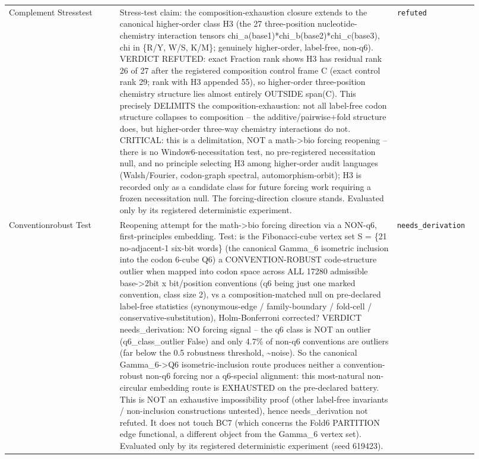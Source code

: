 \begin{longtable}{>{\raggedright\arraybackslash}p{0.22\linewidth}>{\raggedright\arraybackslash}p{0.55\linewidth}>{\raggedright\arraybackslash}p{0.15\linewidth}}
Complement Stresstest & Stress-test claim: the composition-exhaustion closure extends to the canonical higher-order class H3 (the 27 three-position nucleotide-chemistry interaction tensors chi\_a(base1)*chi\_b(base2)*chi\_c(base3), chi in \{R/Y, W/S, K/M\}; genuinely higher-order, label-free, non-q6). VERDICT REFUTED: exact Fraction rank shows H3 has residual rank 26 of 27 after the registered composition control frame C (exact control rank 29; rank with H3 appended 55), so higher-order three-position chemistry structure lies almost entirely OUTSIDE span(C). This precisely DELIMITS the composition-exhaustion: not all label-free codon structure collapses to composition -- the additive/pairwise+fold structure does, but higher-order three-way chemistry interactions do not. CRITICAL: this is a delimitation, NOT a math->bio forcing reopening -- there is no Window6-necessitation test, no pre-registered necessitation null, and no principle selecting H3 among higher-order audit languages (Walsh/Fourier, codon-graph spectral, automorphism-orbit); H3 is recorded only as a candidate class for future forcing work requiring a frozen necessitation null. The forcing-direction closure stands. Evaluated only by its registered deterministic experiment. & \texttt{refuted} \\
Conventionrobust Test & Reopening attempt for the math->bio forcing direction via a NON-q6, first-principles embedding. Test: is the Fibonacci-cube vertex set S = \{21 no-adjacent-1 six-bit words\} (the canonical Gamma\_6 isometric inclusion into the codon 6-cube Q6) a CONVENTION-ROBUST code-structure outlier when mapped into codon space across ALL 17280 admissible base->2bit x bit/position conventions (q6 being just one marked convention, class size 2), vs a composition-matched null on pre-declared label-free statistics (synonymous-edge / family-boundary / fold-cell / conservative-substitution), Holm-Bonferroni corrected? VERDICT needs\_derivation: NO forcing signal -- the q6 class is NOT an outlier (q6\_class\_outlier False) and only 4.7\% of non-q6 conventions are outliers (far below the 0.5 robustness threshold, \textasciitilde{}noise). So the canonical Gamma\_6->Q6 isometric-inclusion route produces neither a convention-robust non-q6 forcing nor a q6-special alignment: this most-natural non-circular embedding route is EXHAUSTED on the pre-declared battery. This is NOT an exhaustive impossibility proof (other label-free invariants / non-inclusion constructions untested), hence needs\_derivation not refuted. It does not touch BC7 (which concerns the Fold6 PARTITION edge functional, a different object from the Gamma\_6 vertex set). Evaluated only by its registered deterministic experiment (seed 619423). & \texttt{needs\_derivation} \\

\end{longtable}
